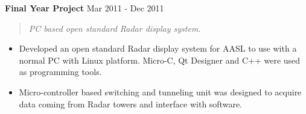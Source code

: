 \documentclass[mm]{res} %
\begin{document}
\begin{resume}
\textbf{Final Year Project} \hfill Mar 2011 - Dec 2011
\begin{quote}
\emph{PC based open standard Radar display system.}
\end{quote}

\begin{itemize} \itemsep -1pt %
\item Developed an open standard Radar display system for AASL to use with a normal PC
with Linux platform. Micro-C, Qt Designer and C++ were used as programming tools.
\item Micro-controller based switching and tunneling unit was designed to acquire data coming from Radar towers and interface with software.
\end{itemize}








\end{resume}
\end{document}
